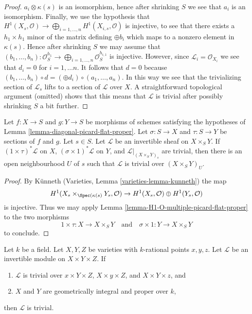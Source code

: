\begin{proof}
$a_i \otimes \kappa(s)$ is an isomorphism, hence after shrinking $S$
we see that $a_i$ is an isomorphism. Finally, we use the hypothesis
that $H^1(X_s, \mathcal{O}) \to
\bigoplus_{i = 1, \ldots, n} H^1(X_{i, s}, \mathcal{O})$
is injective, to see that there exists a $h_1 \times h_1$ minor of the
matrix defining $\oplus b_i$ which maps to a nonzero
element in $\kappa(s)$. Hence after shrinking $S$ we may assume that
$(b_1, \ldots, b_n) : \mathcal{O}_S^{h_1}
\to \bigoplus_{i = 1, \ldots, n} \mathcal{O}_S^{h_{i, 1}}$
is injective. However, since $\mathcal{L}_i = \mathcal{O}_{X_i}$
we see that $d_i = 0$ for $i = 1, \ldots n$. It follows that $d = 0$
because $(b_1, \ldots, b_n) \circ d = (\oplus d_i) \circ (a_1, \ldots, a_n)$.
In this way we see
that the trivializing section of $\mathcal{L}_s$ lifts to a section
of $\mathcal{L}$ over $X$. A straightforward topological argument (omitted)
shows that this means that $\mathcal{L}$ is trivial after possibly
shrinking $S$ a bit further.
\end{proof}

\begin{lemma}
\label{lemma-pic-of-product}
Let $f : X \to S$ and $g : Y \to S$ be morphisms of schemes
satisfying the hypotheses of Lemma \ref{lemma-diagonal-picard-flat-proper}.
Let $\sigma : S \to X$ and $\tau : S \to Y$ be sections of
$f$ and $g$. Let $s \in S$.
Let $\mathcal{L}$ be an invertible sheaf on $X \times_S Y$.
If $(1 \times \tau)^*\mathcal{L}$ on $X$, $(\sigma \times 1)^*\mathcal{L}$
on $Y$, and $\mathcal{L}|_{(X \times_S Y)_s}$ are trivial, then
there is an open neighbourhood $U$ of $s$ such that
$\mathcal{L}$ is trivial over $(X \times_S Y)_U$.
\end{lemma}

\begin{proof}
By K\"unneth (Varieties, Lemma \ref{varieties-lemma-kunneth})
the map
$$
H^1(X_s \times_{\Spec(\kappa(s)} Y_s, \mathcal{O}) \to
H^1(X_s, \mathcal{O}) \oplus H^1(Y_s, \mathcal{O})
$$
is injective. Thus we may
apply Lemma \ref{lemma-H1-O-multiple-picard-flat-proper}
to the two morphisms
$$
1 \times \tau : X \to X \times_S Y
\quad\text{and}\quad
\sigma \times 1 : Y \to X \times_S Y
$$
to conclude.
\end{proof}

\begin{theorem}
\label{theorem-of-the-cube}
Let $k$ be a field. Let $X, Y, Z$ be varieties with
$k$-rational points $x, y, z$. Let $\mathcal{L}$ be an invertible
module on $X \times Y \times Z$. If
\begin{enumerate}
\item $\mathcal{L}$ is trivial over
$x \times Y \times Z$, $X \times y \times Z$, and $X \times Y \times z$, and
\item $X$ and $Y$ are geometrically integral and proper over $k$,
\end{enumerate}
then $\mathcal{L}$ is trivial.
\end{theorem}

